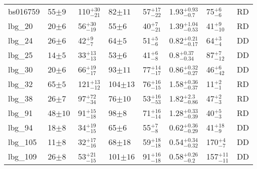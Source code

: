 \documentclass[fleqn,usenatbib]{mn2e}
\begin{document}
\begin{table*}
\begin{threeparttable}
\begin{tabular}{llllllll}
bs016759        & 55$\pm9$                    & 110$^{+30}_{-21}$                    & 82$\pm11$                  & 57$^{+17}_{-22}$         & 1.93$^{+0.93}_{-0.7}$               & 75$^{+6}_{-6}$ & RD    \\[1ex]
lbg\_20         & 20$\pm6$                    & 56$^{+30}_{-19}$                     & 55$\pm6$                  & 40$^{+7}_{-21}$         & 1.39$^{+1.04}_{-0.53}$              & 41$^{+9}_{-10}$ & RD   \\[1ex]
lbg\_24         & 26$\pm6$                    & 42$^{+9}_{-7}$                     & 64$\pm5$                  & 51$^{+5}_{-6}$           & 0.82$^{+0.21}_{-0.17}$          & 64$^{+3}_{-4}$ & DD   \\[1ex]
lbg\_25         & 14$\pm5$                    & 33$^{+13}_{-13}$                     & 53$\pm6$                  & 41$^{+6}_{-8}$         & 0.8$^{+0.37}_{-0.34}$                  & 87$^{+7}_{-12}$  & DD   \\[1ex]
lbg\_30         & 20$\pm6$                    & 66$^{+19}_{-17}$                    & 93$\pm11$                 & 77$^{+14}_{-17}$       & 0.86$^{+0.32}_{-0.27}$               & 46$^{+6}_{-42}$ & DD \\[1ex]
lbg\_32         & 65$\pm5$                    & 121$^{+13}_{-12}$                    & 104$\pm13$                 & 76$^{+16}_{-15}$       & 1.58$^{+0.36}_{-0.37}$               & 11$^{+2}_{-1}$ & RD \\[1ex]
lbg\_38         & 26$\pm7$                    & 97$^{+72}_{-34}$                     & 76$\pm10$                  & 53$^{+16}_{-53}$       & 1.82$^{+2.3}_{-0.86}$               & 47$^{+2}_{-3}$  & RD   \\[1ex]
lbg\_91         & 48$\pm10$                    & 91$^{+15}_{-18}$                     & 98$\pm8$                  & 71$^{+16}_{-14}$        & 1.28$^{+0.33}_{-0.39}$              & 40$^{+5}_{-3}$  & RD  \\[1ex]
lbg\_94         & 18$\pm8$                    & 34$^{+19}_{-15}$                     & 65$\pm6$                  & 55$^{+7}_{-8}$         & 0.62$^{+0.36}_{-0.29}$                & 41$^{+18}_{-9}$  & DD  \\[1ex]
lbg\_105        & 11$\pm8$                    & 32$^{+17}_{-16}$                     & 68$\pm18$                  & 59$^{+18}_{-18}$        & 0.54$^{+0.34}_{-0.32}$                & 170$^{+4}_{-7}$ & DD  \\[1ex]
lbg\_109        & 26$\pm8$                    & 53$^{+21}_{-15}$                     & 101$\pm16$                 & 91$^{+16}_{-18}$      & 0.58$^{+0.26}_{-0.2}$                & 157$^{+11}_{-11}$ & DD  \\[1ex]

\end{tabular}
\end{threeparttable}
\end{table*}
\end{document}
